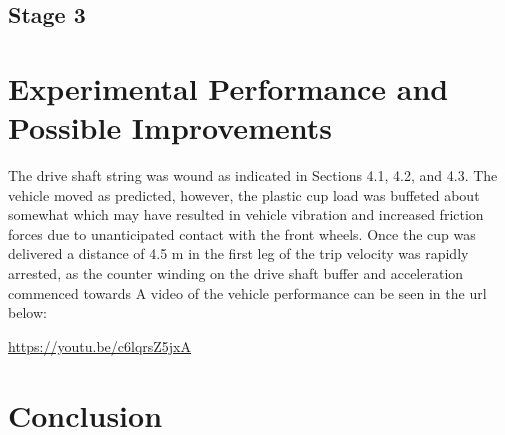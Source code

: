 \documentclass[a4paper]{article}
\begin{document}
\subsection{Stage 3}

\section{Experimental Performance and Possible Improvements}
The drive shaft string was wound as indicated in Sections 4.1, 4.2, and 4.3. The vehicle moved as predicted, however, the plastic cup load was buffeted about somewhat which may have resulted in vehicle vibration and increased friction forces due to unanticipated contact with the front wheels. Once the cup was delivered a distance of 4.5 $\si{\meter}$ in the first leg of the trip velocity was rapidly arrested, as the counter winding on the drive shaft buffer  and acceleration commenced towards A video of the vehicle performance can be seen in the url below:
\begin{center}
	\url{https://youtu.be/c6lqrsZ5jxA}
\end{center}




\section{Conclusion}



\end{document}
